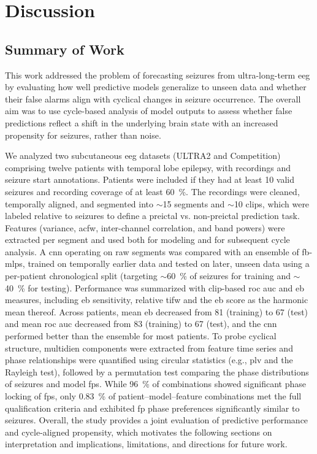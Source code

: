 \chapter{Discussion}\label{ch:discussion}
\section{Summary of Work}
This work addressed the problem of forecasting seizures from ultra-long-term \gls{eeg} by evaluating how well predictive models generalize to unseen data and whether their false alarms align with cyclical changes in seizure occurrence.
The overall aim was to use cycle-based analysis of model outputs to assess whether false predictions reflect a shift in the underlying brain state with an increased propensity for seizures, rather than noise.

We analyzed two subcutaneous \gls{eeg} datasets (ULTRA2 and Competition) comprising twelve patients with temporal lobe epilepsy, with recordings and seizure start annotations. 
Patients were included if they had at least 10 valid seizures and recording coverage of at least \SI{60}{\percent}. 
The recordings were cleaned, temporally aligned, and segmented into $\sim$\SI{15}{\sec} segments and $\sim$\SI{10}{\min} clips, which were labeled relative to seizures to define a preictal vs. non-preictal prediction task. 
Features (variance, \gls{acfw}, inter-channel correlation, and band powers) were extracted per segment and used both for modeling and for subsequent cycle analysis. 
A \gls{cnn} operating on raw segments was compared with an ensemble of \glspl{fb-mlp}, trained on temporally earlier data and tested on later, unseen data using a per-patient chronological split (targeting $\sim$\SI{60}{\percent} of seizures for training and $\sim$\SI{40}{\percent} for testing).
Performance was summarized with clip-based \gls{roc auc} and \gls{eb} measures, including \gls{eb} sensitivity, relative \gls{tifw} and the \gls{eb} score as the harmonic mean thereof.
Across patients, mean \gls{eb} decreased from 81 (training) to 67 (test) and mean \gls{roc auc} decreased from 83 (training) to 67 (test), and the \gls{cnn} performed better than the ensemble for most patients. 
To probe cyclical structure, multidien components were extracted from feature time series and phase relationships were quantified using circular statistics (e.g., \gls{plv} and the Rayleigh test), followed by a permutation test comparing the phase distributions of seizures and model \glspl{fp}.
While \SI{96}{\percent} of combinations showed significant phase locking of \glspl{fp}, only \SI{0.83}{\percent} of patient--model--feature combinations met the full qualification criteria and exhibited \gls{fp} phase preferences significantly similar to seizures. 
Overall, the study provides a joint evaluation of predictive performance and cycle-aligned propensity, which motivates the following sections on interpretation and implications, limitations, and directions for future work.


